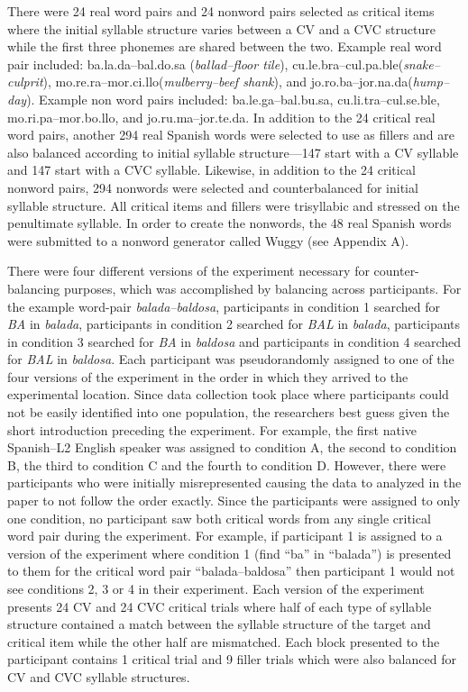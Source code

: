 There were 24 real word pairs and 24 nonword pairs selected as critical items where the initial syllable structure varies between a CV and a CVC structure while the first three phonemes are shared between the two. Example real word pair included: ba.la.da–bal.do.sa (\emph{ballad–floor tile}), cu.le.bra–cul.pa.ble(\emph{snake–culprit}), mo.re.ra–mor.ci.llo(\emph{mulberry–beef shank}), and jo.ro.ba–jor.na.da(\emph{hump–day}). Example non word pairs included: ba.le.ga–bal.bu.sa, cu.li.tra–cul.se.ble, mo.ri.pa–mor.bo.llo, and jo.ru.ma–jor.te.da. In addition to the 24 critical real word pairs, another 294 real Spanish words were selected to use as fillers and are also balanced according to initial syllable structure—147 start with a CV syllable and 147 start with a CVC syllable. Likewise, in addition to the 24 critical nonword pairs, 294 nonwords were selected and counterbalanced for initial syllable structure. All critical items and fillers were trisyllabic and stressed on the penultimate syllable. In order to create the nonwords, the 48 real Spanish words were submitted to a nonword generator called Wuggy (see Appendix A). %

There were four different versions of the experiment necessary for counter-balancing purposes, which was accomplished by balancing across participants. For the example word-pair \emph{balada–baldosa}, participants in condition 1 searched for \emph{BA} in \emph{balada}, participants in condition 2 searched for \emph{BAL} in \emph{balada}, participants in condition 3 searched for \emph{BA} in \emph{baldosa} and participants in condition 4 searched for \emph{BAL} in \emph{baldosa}. Each participant was pseudorandomly assigned to one of the four versions of the experiment in the order in which they arrived to the experimental location. Since data collection took place where participants could not be easily identified into one population, the researchers best guess given the short introduction preceding the experiment. For example, the first native Spanish–L2 English speaker was assigned to condition A, the second to condition B, the third to condition C and the fourth to condition D. However, there were participants who were initially misrepresented causing the data to analyzed in the paper to not follow the order exactly. Since the participants were assigned to only one condition, no participant saw both critical words from any single critical word pair during the experiment. For example, if participant 1 is assigned to a version of the experiment where condition 1 (find “ba” in “balada”) is presented to them for the critical word pair “balada–baldosa” then participant 1 would not see conditions 2, 3 or 4 in their experiment. Each version of the experiment presents 24 CV and 24 CVC critical trials where half of each type of syllable structure contained a match between the syllable structure of the target and critical item while the other half are mismatched. Each block presented to the participant contains 1 critical trial and 9 filler trials which were also balanced for CV and CVC syllable structures.


